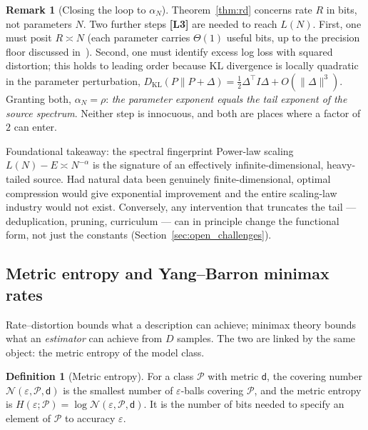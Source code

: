 \documentclass[11pt,a4paper]{article}
\theoremstyle{definition}
\newtheorem{definition}{Definition}[section]
\newtheorem{remark}{Remark}[section]
\begin{document}
\begin{remark}[Closing the loop to $\alpha_N$]
Theorem~\ref{thm:rd} concerns rate $R$ in bits, not parameters $N$. Two further steps \textbf{[L3]} are needed to reach $L(N)$. First, one must posit $R \asymp N$ (each parameter carries $\Theta(1)$ useful bits, up to the precision floor discussed in~\cite{kumar2024precision}). Second, one must identify excess log loss with squared distortion; this holds to leading order because KL divergence is locally quadratic in the parameter perturbation, $D_{\mathrm{KL}}(P\|P+\Delta) = \tfrac{1}{2}\Delta^\top I \Delta + O(\|\Delta\|^3)$. Granting both, $\alpha_N = \rho$: \emph{the parameter exponent equals the tail exponent of the source spectrum}. Neither step is innocuous, and both are places where a factor of $2$ can enter.
\end{remark}

\begin{takeaway}{Foundational takeaway: the spectral fingerprint}
Power-law scaling $L(N)-E \asymp N^{-\alpha}$ is the signature of an effectively infinite-dimensional, heavy-tailed source. Had natural data been genuinely finite-dimensional, optimal compression would give exponential improvement and the entire scaling-law industry would not exist. Conversely, any intervention that truncates the tail --- deduplication, pruning, curriculum --- can in principle change the functional form, not just the constants (Section~\ref{sec:open_challenges}).
\end{takeaway}

\subsection{Metric entropy and Yang--Barron minimax rates}

Rate--distortion bounds what a description can achieve; minimax theory bounds what an \emph{estimator} can achieve from $D$ samples. The two are linked by the same object: the metric entropy of the model class.

\begin{definition}[Metric entropy]
For a class $\mathcal{P}$ with metric $\mathsf{d}$, the covering number $\mathcal{N}(\varepsilon,\mathcal{P},\mathsf{d})$ is the smallest number of $\varepsilon$-balls covering $\mathcal{P}$, and the metric entropy is $H(\varepsilon;\mathcal{P}) = \log\mathcal{N}(\varepsilon,\mathcal{P},\mathsf{d})$. It is the number of bits needed to specify an element of $\mathcal{P}$ to accuracy $\varepsilon$.
\end{definition}
\end{document}
